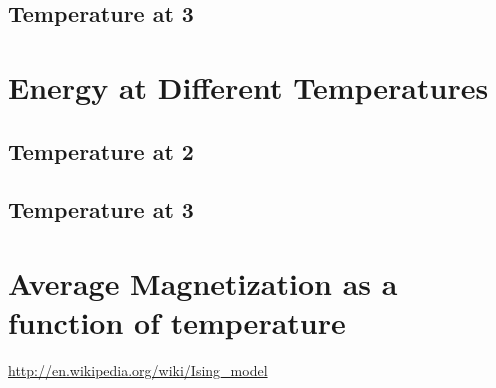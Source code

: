 \documentclass[]{article}
\begin{document}
    \subsection{\label{sec:level2} Temperature at 3}

\section{Energy at Different Temperatures}

    \subsection{\label{sec:level2} Temperature at 2}

    \subsection{\label{sec:level2} Temperature at 3}

\section{Average Magnetization as a function of temperature}

    \url{http://en.wikipedia.org/wiki/Ising_model}
\end{document}
